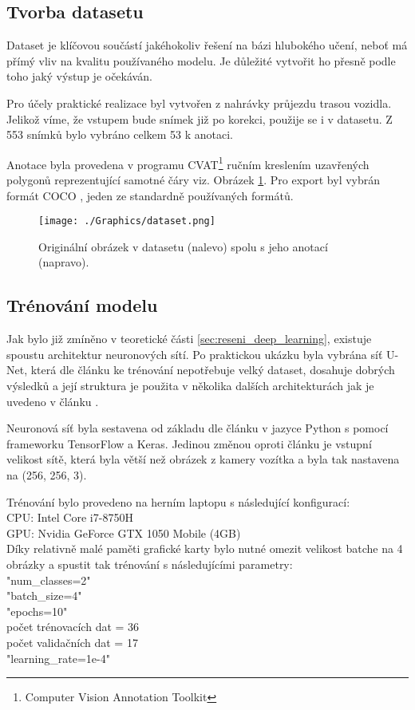 \documentclass[czech, bc, kky, he, iso690numb]{fasthesis}
\begin{document}
        	\subsection{Tvorba datasetu}
        		Dataset je klíčovou součástí jakéhokoliv řešení na bázi hlubokého učení, neboť má přímý vliv na kvalitu používaného modelu. Je důležité vytvořit ho přesně podle toho jaký výstup je očekáván.
        		
        		Pro účely praktické realizace byl vytvořen z nahrávky průjezdu trasou vozidla. Jelikož víme, že vstupem bude snímek již po korekci, použije se i v datasetu. Z 553 snímků bylo vybráno celkem 53 k anotaci.
        		
        		Anotace byla provedena v programu CVAT\footnote{Computer Vision Annotation Toolkit} ručním kreslením uzavřených polygonů reprezentující samotné čáry viz. Obrázek \ref{pic:anotace}. Pro export byl vybrán formát COCO \cite{COCO_format}, jeden ze standardně používaných formátů.
        			
        			\begin{figure}[h]
        				\centering
        				\texttt{[image: ./Graphics/dataset.png]}
        				\caption{Originální obrázek v datasetu (nalevo) spolu s jeho anotací (napravo).}
        				\label{pic:anotace}
        			\end{figure}
        	\subsection{Trénování modelu}
        		Jak bylo již zmíněno v teoretické části \ref{sec:reseni_deep_learning}, existuje spoustu architektur neuronových sítí. Po praktickou ukázku byla vybrána síť U-Net, která dle článku \cite{U-Net} ke trénování nepotřebuje velký dataset, dosahuje dobrých výsledků a její struktura je použita v několika dalších architekturách jak je uvedeno v článku \cite{semantic_segmentation_survey}.
        		
        		Neuronová síť byla sestavena od základu dle článku \cite{U-Net} v jazyce Python s pomocí frameworku TensorFlow a Keras. Jedinou změnou oproti článku je vstupní velikost sítě, která byla větší než obrázek z kamery vozítka a byla tak nastavena na (256, 256, 3).
        		 
        		Trénování bylo provedeno na herním laptopu s následující konfigurací:\\
        		CPU: Intel Core i7-8750H\\
        		GPU: Nvidia GeForce GTX 1050 Mobile (4GB)\\
        		Díky relativně malé paměti grafické karty bylo nutné omezit velikost batche na 4 obrázky a spustit tak trénování s následujícími parametry:\\
        		\command"num_classes=2"\\
        		\command"batch_size=4"\\
        		\command"epochs=10"\\
        		počet trénovacích dat = 36\\
        		počet validačních dat = 17\\
        		\command"learning_rate=1e-4"\\
        		
\end{document}
